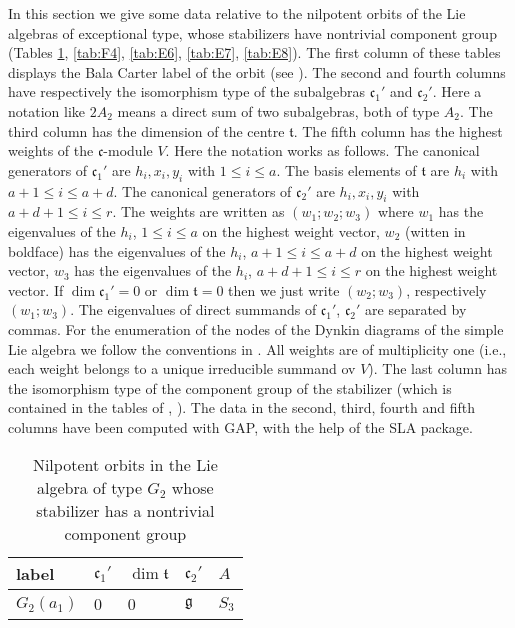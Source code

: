 \documentclass[a4paper,10pt]{amsart}
\newcommand{\mf}{\mathfrak}
\newcommand{\g}{\mf{g}}
\renewcommand{\c}{\mf{c}}
\newcommand{\ttt}{\mf{t}}
\numberwithin{equation}{section}
\theoremstyle{remark}
\theoremstyle{remark}
\begin{document}
In this section we give some data relative to the nilpotent orbits of the
Lie algebras of exceptional type, whose stabilizers have nontrivial
component group (Tables \ref{tab:G2}, \ref{tab:F4}, \ref{tab:E6}, \ref{tab:E7},
\ref{tab:E8}). The first column of these tables displays the Bala Carter
label of the orbit (see \cite[Chapter 8]{colmcgov}).
The second and fourth columns have
respectively the isomorphism type of the subalgebras $\c_1'$ and $\c_2'$.
Here a notation like $2A_2$ means a direct sum of two subalgebras, both
of type $A_2$. The third column has the dimension of the centre $\ttt$.
The fifth column has the highest weights of the $\c$-module $V$. Here the
notation works as follows. The canonical generators of $\c_1'$ are
$h_i,x_i,y_i$ with $1\leq i\leq a$. The basis elements of $\ttt$ are
$h_i$ with $a+1\leq i\leq a+d$. The canonical generators of $\c_2'$ are
$h_i,x_i,y_i$ with $a+d+1\leq i\leq r$. The weights are written as 
$(w_1 ; w_2; w_3 )$ where $w_1$ has the eigenvalues of the $h_i$, $1\leq i\leq a$
on the highest weight vector, $w_2$ (witten in boldface) has the eigenvalues
of the $h_i$, $a+1\leq i\leq a+d$ on the highest weight vector, $w_3$ has the
eigenvalues of the $h_i$, $a+d+1\leq i\leq r$ on the highest weight vector.
If $\dim \c_1'=0$ or $\dim \ttt=0$ then we just write $(w_2;w_3)$, respectively
$(w_1;w_3)$. The eigenvalues of direct summands of $\c_1'$, $\c_2'$ are
separated by commas. For the enumeration of the nodes of the Dynkin diagrams
of the simple Lie algebra we follow the conventions in
\cite[Planche I-IX]{bou4}.
All weights are of multiplicity one (i.e.,
each weight belongs to a unique irreducible summand ov $V$).
The last column has the isomorphism type of the
component group of the stabilizer (which is contained in the tables of
\cite[Chapter 8]{colmcgov}, \cite{sommers}). The data in the second, third,
fourth and fifth
columns have been computed with {\sf GAP}, with the help of the
{\sf SLA} package.


\begin{longtable}{|l|l|l|l|l|}
\caption{Nilpotent orbits in the Lie algebra of type $G_2$ whose stabilizer
  has a nontrivial component group}\label{tab:G2} 
\endfirsthead
\hline
\endhead
\hline
\endfoot
\endlastfoot

\hline
label & $\c_1'$ & $\dim \ttt$ & $\c_2'$ & $A$\\
\hline
$G_2(a_1)$ & 0 & 0 & $\g$ & $S_3$\\
\hline  
\end{longtable}
\end{document}
